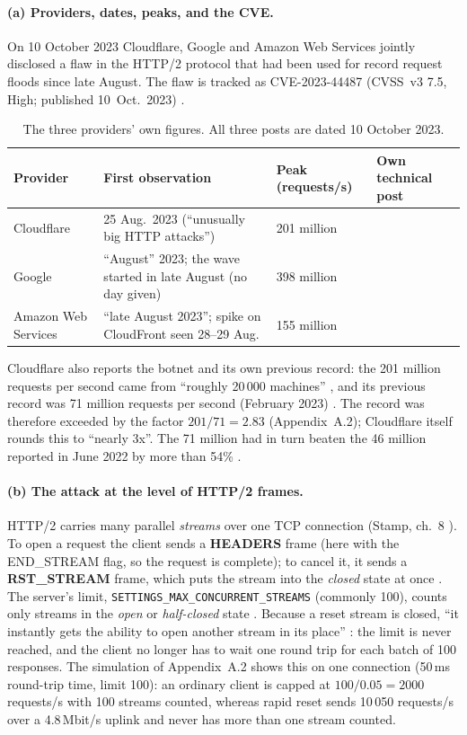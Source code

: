 \documentclass[11pt,a4paper]{article}
\newcommand{\code}[1]{\texttt{#1}}
\begin{document}
\paragraph{(a) Providers, dates, peaks, and the CVE.} On 10 October 2023 Cloudflare, Google and Amazon Web Services
jointly disclosed a flaw in the HTTP/2 protocol that had been used for record request floods since late August.
The flaw is tracked as CVE-2023-44487 (CVSS~v3 7.5, High; published 10~Oct.\ 2023) \cite{nvd}.
\begin{table}[H]
\centering\small
\begin{tabularx}{\textwidth}{@{}P{2.3cm}P{4.4cm}P{3.2cm}L@{}}
\toprule
Provider & First observation & Peak (requests/s) & Own technical post \\
\midrule
Cloudflare & 25 Aug.\ 2023 (``unusually big HTTP attacks'') & 201 million & \cite{cfzero,cftech} \\
Google & ``August'' 2023; the wave started in late August (no day given) & 398 million & \cite{googlehow,google398} \\
Amazon Web Services & ``late August 2023''; spike on CloudFront seen 28--29 Aug. & 155 million & \cite{aws} \\
\bottomrule
\end{tabularx}
\caption{The three providers' own figures. All three posts are dated 10 October 2023.}\label{tab:providers}
\end{table}
Cloudflare also reports the botnet and its own previous record: the 201 million requests per second came from
``roughly 20\,000 machines'' \cite{cfzero}, and its previous record was 71 million requests per second
(February 2023) \cite{cf71}. The record was therefore exceeded by the factor
$201/71 = 2.83$ (Appendix~A.2); Cloudflare itself rounds this to ``nearly 3x''. The 71 million had in turn beaten the
46 million reported in June 2022 by more than 54\% \cite{cf71}.

\paragraph{(b) The attack at the level of HTTP/2 frames.} HTTP/2 carries many parallel \emph{streams} over one TCP
connection (Stamp, ch.~8 \cite{stamp}). To open a request the client sends a \textbf{HEADERS} frame (here with the
END\_STREAM flag, so the request is complete); to cancel it, it sends a \textbf{RST\_STREAM} frame, which puts the
stream into the \emph{closed} state at once \cite{cftech,rfc9113}. The server's limit,
\code{SETTINGS\_MAX\_CONCURRENT\_STREAMS} (commonly 100), counts only streams in the \emph{open} or
\emph{half-closed} state \cite{rfc9113}. Because a reset stream is closed, ``it instantly gets the ability to open another
stream in its place'' \cite{cftech}: the limit is never reached, and the client no longer has to wait one round trip for
each batch of 100 responses. The simulation of Appendix~A.2 shows this on one connection (50\,ms round-trip time,
limit 100): an ordinary client is capped at $100/0.05=2000$ requests/s with 100 streams counted, whereas rapid reset
sends 10\,050 requests/s over a 4.8\,Mbit/s uplink and never has more than one stream counted.
\end{document}
